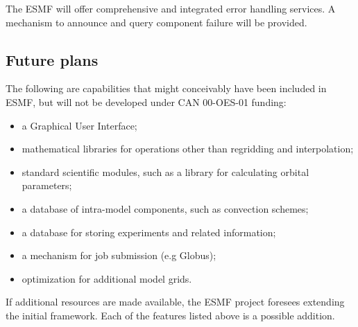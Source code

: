 The ESMF will offer comprehensive and integrated error handling
services.  A mechanism to announce and query component failure will be
provided.

\subsection{Future plans}

The following are capabilities that might conceivably have been
included in ESMF, but will not be developed under CAN 00-OES-01
funding:
\begin{itemize}
\item a Graphical User Interface;
\item mathematical libraries for operations other than regridding and
  interpolation;
\item standard scientific modules, such as a library for calculating
  orbital parameters;
\item a database of intra-model components, such as convection schemes;
\item a database for storing experiments and related information;
\item a mechanism for job submission (e.g Globus);
\item optimization for additional model grids.
\end{itemize}

If additional resources are made available, the ESMF project foresees
extending the initial framework.  Each of the features listed above is
a possible addition.




















